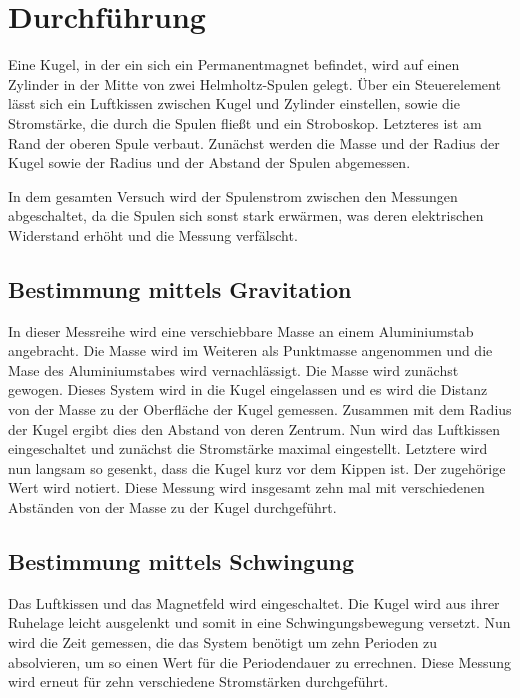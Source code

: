 \section{Durchführung}
\label{sec:Durchführung}

Eine Kugel, in der ein sich ein Permanentmagnet befindet, wird auf einen Zylinder in der Mitte von zwei Helmholtz-Spulen gelegt.
Über ein Steuerelement lässt sich ein Luftkissen zwischen Kugel und Zylinder einstellen, sowie die Stromstärke, die durch die Spulen fließt und ein Stroboskop. 
Letzteres ist am Rand der oberen Spule verbaut.
Zunächst werden die Masse und der Radius der Kugel sowie der Radius und der Abstand der Spulen abgemessen.

In dem gesamten Versuch wird der Spulenstrom zwischen den Messungen abgeschaltet, da die Spulen sich sonst stark erwärmen, was deren elektrischen Widerstand erhöht und die Messung verfälscht.

\subsection{Bestimmung mittels Gravitation}

In dieser Messreihe wird eine verschiebbare Masse an einem Aluminiumstab angebracht. Die Masse wird im Weiteren als Punktmasse angenommen und die Mase des Aluminiumstabes wird vernachlässigt.
Die Masse wird zunächst gewogen.
Dieses System wird in die Kugel eingelassen und es wird die Distanz von der Masse zu der Oberfläche der Kugel gemessen. Zusammen mit dem Radius der Kugel ergibt dies den Abstand von deren Zentrum.
Nun wird das Luftkissen eingeschaltet und zunächst die Stromstärke maximal eingestellt. Letztere wird nun langsam so gesenkt, dass die Kugel kurz vor dem Kippen ist. Der zugehörige Wert wird notiert.
Diese Messung wird insgesamt zehn mal mit verschiedenen Abständen von der Masse zu der Kugel durchgeführt.

\subsection{Bestimmung mittels Schwingung}

Das Luftkissen und das Magnetfeld wird eingeschaltet. Die Kugel wird aus ihrer Ruhelage leicht ausgelenkt und somit in eine Schwingungsbewegung versetzt.
Nun wird die Zeit gemessen, die das System benötigt um zehn Perioden zu absolvieren, um so einen Wert für die Periodendauer zu errechnen.
Diese Messung wird erneut für zehn verschiedene Stromstärken durchgeführt.

